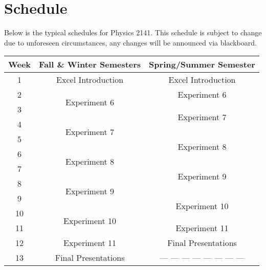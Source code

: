\section*{Schedule}
Below is the typical schedules for Physics 2141.
This schedule is subject to change due to unforeseen circumstances, any changes will be announced via blackboard.
\begin{table}[h]
	\centering
	\begin{tabular}{ |c|c|c| } 
	 \hline
	 \textbf{Week} & \textbf{Fall \& Winter Semesters} & \textbf{Spring/Summer Semester} \\ 
	 \hline
	 1 & Excel Introduction & Excel Introduction \\ 
	 \hline 
	 2 & \multirow{2}{*}{Experiment 6} & Experiment 6 \\ 
	 \cline{1-1} \cline{3-3} 
	 3 & & \multirow{2}{*}{Experiment 7} \\ 
	 \cline{1-2}
	 4 & \multirow{2}{*}{Experiment 7} & \\ 
	 \cline{1-1} \cline{3-3}
	 5 & & \multirow{2}{*}{Experiment 8} \\ 
	 \cline{1-2}
	 6 & \multirow{2}{*}{Experiment 8} & \\ 
	 \cline{1-1} \cline{3-3}
	 7 & & \multirow{2}{*}{Experiment 9} \\ 
	 \cline{1-2}
	 8 & \multirow{2}{*}{Experiment 9} & \\ 
	 \cline{1-1} \cline{3-3}
	 9 & & \multirow{2}{*}{Experiment 10} \\ 
	 \cline{1-2}
	 10 & \multirow{2}{*}{Experiment 10} & \\ 
	 \cline{1-1} \cline{3-3}
	 11 & & Experiment 11 \\ 
	 \hline
	 12 & Experiment 11 & Final Presentations \\ 
	 \hline
	 13 & Final Presentations & --- --- --- --- --- --- --- --- \\ 
	 \hline
	\end{tabular}
\end{table}

